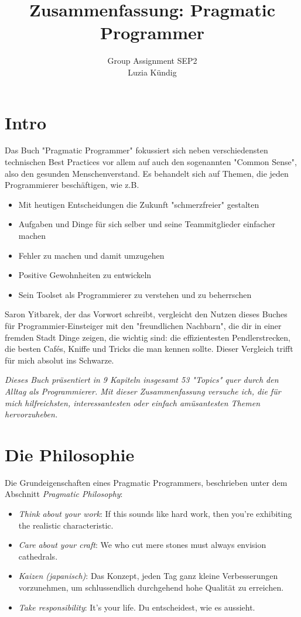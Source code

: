 \documentclass[10pt, oneside]{article}
\begin{document}
\title{Zusammenfassung: Pragmatic Programmer}
\author{Group Assignment SEP2\\Luzia Kündig}
\maketitle

\tableofcontents

\section{Intro}
Das Buch "Pragmatic Programmer" fokussiert sich neben verschiedensten technischen Best Practices vor allem auf auch den sogenannten 
"Common Sense", also den gesunden Menschenverstand. Es behandelt sich auf Themen, die jeden Programmierer beschäftigen, wie z.B.  
\begin{itemize}[itemsep=4pt]
    \item Mit heutigen Entscheidungen die Zukunft "schmerzfreier" gestalten 
    \item Aufgaben und Dinge für sich selber und seine Teammitglieder einfacher machen 
    \item Fehler zu machen und damit umzugehen 
    \item Positive Gewohnheiten zu entwickeln 
    \item Sein Toolset als Programmierer zu verstehen und zu beherrschen 
\end{itemize}

Saron Yitbarek, der das Vorwort schreibt, vergleicht den Nutzen dieses Buches für Programmier-Einsteiger mit den "freundlichen Nachbarn", 
die dir in einer fremden Stadt Dinge zeigen, die wichtig sind: die effizientesten Pendlerstrecken, die besten Cafés, Kniffe und Tricks die man kennen sollte. 
Dieser Vergleich trifft für mich absolut ins Schwarze.  

\emph{Dieses Buch präsentiert in 9 Kapiteln insgesamt 53 "Topics" quer durch den Alltag als Programmierer. Mit dieser Zusammenfassung versuche ich, die für mich hilfreichsten, 
interessantesten oder einfach amüsantesten Themen hervorzuheben. }

\section{Die Philosophie}
Die Grundeigenschaften eines Pragmatic Programmers, beschrieben unter dem Abschnitt \emph{Pragmatic Philosophy}: 
\begin{itemize}[itemsep=4pt]
    \item \emph{Think about your work}: If this sounds like hard work, then you're exhibiting the realistic characteristic. 
    \item \emph{Care about your craft}: We who cut mere stones must always envision cathedrals. 
    \item \emph{Kaizen (japanisch)}: Das Konzept, jeden Tag ganz kleine Verbesserungen vorzunehmen, um schlussendlich durchgehend hohe Qualität zu erreichen. 
    \item \emph{Take responsibility}: It's your life. Du entscheidest, wie es aussieht.
\end{itemize}
\end{document}
